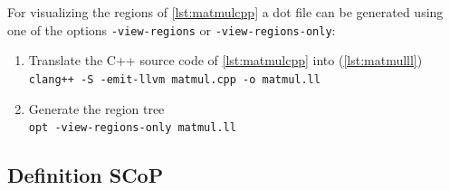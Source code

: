\begin{sloppypar}
    \noindent
    For visualizing the regions of \autoref{lst:matmulcpp} a dot file can be generated using one of the options \texttt{-view-regions} or \texttt{-view-regions-only}:
\end{sloppypar}
\begin{enumerate}
    \item Translate the C++ source code of \autoref{lst:matmulcpp} into \llvmir (\autoref{lst:matmulll})\\
        \texttt{clang++ -S -emit-llvm matmul.cpp -o matmul.ll}
    \item Generate the region tree\\
        \texttt{opt -view-regions-only matmul.ll}
\end{enumerate}
\subsection{Definition SCoP}\label{subsec:definitionScop}

